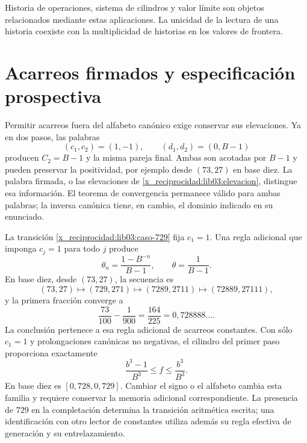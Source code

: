 Historia de operaciones, sistema de cilindros y valor límite son
objetos relacionados mediante estas aplicaciones. La unicidad de la
lectura de una historia coexiste con la multiplicidad de historias en
los valores de frontera.

\section{Acarreos firmados y especificación prospectiva}
\label{x_reciprocidad:lib03:firmados}

Permitir acarreos fuera del alfabeto canónico exige conservar sus
elevaciones. Ya en dos pasos, las palabras
\[
 (c_1,c_2)=(1,-1),\qquad(d_1,d_2)=(0,B-1)
\]
producen \(C_2=B-1\) y la misma pareja final. Ambas son acotadas por
\(B-1\) y pueden preservar la positividad, por ejemplo desde
\((73,27)\) en base diez. La palabra firmada, o las elevaciones de
\eqref{x_reciprocidad:lib03:elevacion}, distingue esa información. El teorema de
convergencia permanece válido para ambas palabras; la inversa canónica
tiene, en cambio, el dominio indicado en su enunciado.

La transición \eqref{x_reciprocidad:lib03:caso-729} fija \(c_1=1\). Una regla
adicional que imponga \(c_j=1\) para todo \(j\) produce
\begin{equation}
 \theta_n=\frac{1-B^{-n}}{B-1},\qquad
 \theta=\frac1{B-1}.
 \label{x_reciprocidad:lib03:acarreo-constante}
\end{equation}
En base diez, desde \((73,27)\), la secuencia es
\[
 (73,27)\longmapsto(729,271)\longmapsto(7289,2711)
 \longmapsto(72889,27111),
\]
y la primera fracción converge a
\begin{equation}
 \frac{73}{100}-\frac1{900}=\frac{164}{225}
 =0{,}728888\ldots.
 \label{x_reciprocidad:lib03:limite-constante}
\end{equation}
La conclusión pertenece a esa regla adicional de acarreos constantes.
Con sólo \(c_1=1\) y prolongaciones canónicas no negativas, el cilindro
del primer paso proporciona exactamente
\begin{equation}
 \frac{b^3-1}{B^3}\leq f\leq\frac{b^3}{B^3}.
 \label{x_reciprocidad:lib03:primer-cilindro}
\end{equation}
En base diez es \([0{,}728,0{,}729]\). Cambiar el signo o el alfabeto
cambia esta familia y requiere conservar la memoria adicional
correspondiente. La presencia de \(729\) en la completación determina
la transición aritmética escrita; una identificación con otro lector de
constantes utiliza además su regla efectiva de generación y su
entrelazamiento.

